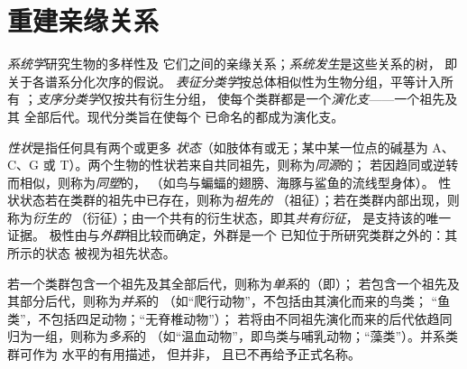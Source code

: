 \section{重建亲缘关系}

\begin{definition}\label{def:b1:classifying-biodiversity:systematics}
\emph{系统学}研究生物的多样性及
它们之间的亲缘关系；\emph{系统发生}是这些关系的树，
即关于各谱系分化次序的假说。
\emph{表征分类学}按总体相似性为生物分组，平等计入所有
；\emph{支序分类学}仅按共有衍生分组，
使每个类群都是一个\emph{演化支}——一个祖先及其
全部后代。现代分类旨在使每个
已命名的都成为演化支。
\end{definition}

\begin{definition}[性状：同源、同塑与极性]\label{def:b1:classifying-biodiversity:characters}
\emph{性状}是指任何具有两个或更多
\emph{状态}（如肢体有或无；某中某一位点的碱基为 A、C、G
或 T）。两个生物的性状若来自共同祖先，则称为\emph{同源}的；
若因趋同或逆转而相似，则称为\emph{同塑}的，
（如鸟与蝙蝠的翅膀、海豚与鲨鱼的流线型身体）。
性状状态若在类群的祖先中已存在，则称为\emph{祖先的}
（祖征）；若在类群内部出现，则称为\emph{衍生的}
（衍征）；由一个共有的衍生状态，即其\emph{共有衍征}，
是支持该的唯一证据。
极性由与\emph{外群}相比较而确定，外群是一个
已知位于所研究类群之外的：其所示的状态
被视为祖先状态。
\end{definition}

\begin{definition}[单系、并系与多系]\label{def:b1:classifying-biodiversity:monophyly}
若一个类群包含一个祖先及其全部后代，则称为\emph{单系}的（即）；
若包含一个祖先及其部分后代，则称为\emph{并系}的
（如“爬行动物”，不包括由其演化而来的鸟类；
“鱼类”，不包括四足动物；“无脊椎动物”）；
若将由不同祖先演化而来的后代依趋同归为一组，则称为\emph{多系}的
（如“温血动物”，即鸟类与哺乳动物；“藻类”）。并系类群可作为
水平的有用描述，
但并非，
且已不再给予正式名称。
\end{definition}

